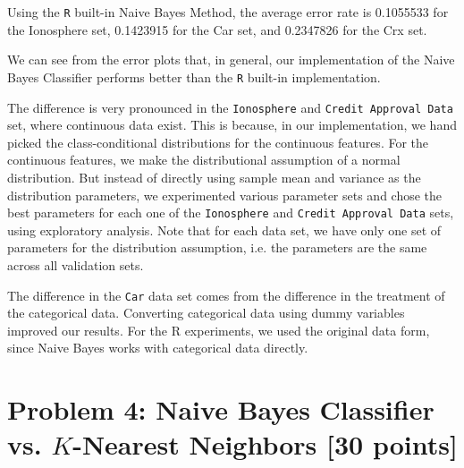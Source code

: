 \documentclass{article}
\newcommand{\code}[1]{\texttt{#1}}
\begin{document}
Using the \code{R} built-in Naive Bayes Method, the average error rate is 0.1055533 for the Ionosphere set, 0.1423915 for the Car set, and 0.2347826 for the Crx set.
\bigskip


We can see from the error plots that, in general, our implementation of the Naive Bayes Classifier performs better than the \code{R} built-in implementation.

The difference is very pronounced in the \code{Ionosphere} and \code{Credit Approval Data} set, where continuous data exist. 
This is because, in our implementation, we hand picked the class-conditional distributions for the continuous features. For the continuous features, we make the distributional assumption of a normal distribution. But instead of directly using sample mean and variance as the distribution parameters, we experimented various parameter sets and chose the best parameters for each one of the \code{Ionosphere} and \code{Credit Approval Data} sets, using exploratory analysis. 
Note that for each data set, we have only one set of parameters for the distribution assumption, i.e. the parameters are the same across all validation sets.

The difference in the \code{Car} data set comes from the difference in the treatment of the categorical data. Converting categorical data using dummy variables improved our results. For the R experiments, we used the original data form, since Naive Bayes works with categorical data directly.
































%
\newpage
\section*{Problem 4: Naive Bayes Classifier vs. $K$-Nearest Neighbors [30 points]} 
\end{document}
